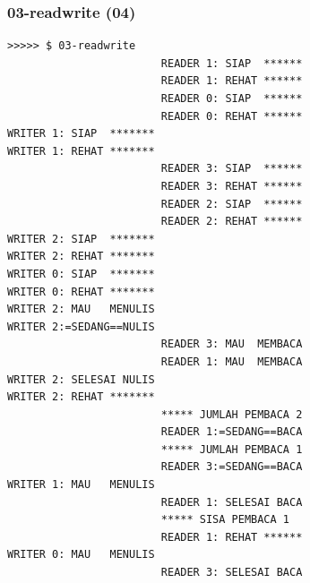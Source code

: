 \documentclass[xcolor=table, notheorems, hyperref={pdfpagelabels=false}]{beamer}
\begin{document}
\begin{frame}[fragile]
\frametitle{03-readwrite (04)}
\begin{lstlisting}[basicstyle=\ttfamily\tiny]
>>>>> $ 03-readwrite 
                        READER 1: SIAP  ******
                        READER 1: REHAT ******
                        READER 0: SIAP  ******
                        READER 0: REHAT ******
WRITER 1: SIAP  *******
WRITER 1: REHAT *******
                        READER 3: SIAP  ******
                        READER 3: REHAT ******
                        READER 2: SIAP  ******
                        READER 2: REHAT ******
WRITER 2: SIAP  *******
WRITER 2: REHAT *******
WRITER 0: SIAP  *******
WRITER 0: REHAT *******
WRITER 2: MAU   MENULIS
WRITER 2:=SEDANG==NULIS
                        READER 3: MAU  MEMBACA
                        READER 1: MAU  MEMBACA
WRITER 2: SELESAI NULIS
WRITER 2: REHAT *******
                        ***** JUMLAH PEMBACA 2
                        READER 1:=SEDANG==BACA
                        ***** JUMLAH PEMBACA 1
                        READER 3:=SEDANG==BACA
WRITER 1: MAU   MENULIS
                        READER 1: SELESAI BACA
                        ***** SISA PEMBACA 1
                        READER 1: REHAT ******
WRITER 0: MAU   MENULIS
                        READER 3: SELESAI BACA

\end{lstlisting}
\end{frame}

\end{document}
